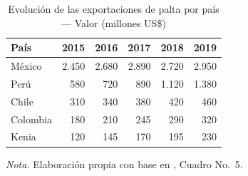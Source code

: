 \begin{table}[H]
\centering
\caption{Evoluci\'on de las exportaciones de palta por pa\'is --- Valor (millones US\$)}
\label{tab:exportaciones_pais}
\small
\begin{tabular}{lrrrrr}
\toprule
\textbf{Pa\'is} & \textbf{2015} & \textbf{2016} & \textbf{2017} & \textbf{2018} & \textbf{2019} \\
\midrule
M\'exico   & 2.450 & 2.680 & 2.890 & 2.720 & 2.950 \\
Per\'u     &   580 &   720 &   890 & 1.120 & 1.380 \\
Chile      &   310 &   340 &   380 &   420 &   460 \\
Colombia   &   180 &   210 &   245 &   290 &   320 \\
Kenia      &   120 &   145 &   170 &   195 &   230 \\
\bottomrule
\end{tabular}
\parbox{0.94\textwidth}{\small \textit{Nota.} Elaboraci\'on propia con base en \citep{SierraSelva2020}, Cuadro No.~5.}
\end{table}
